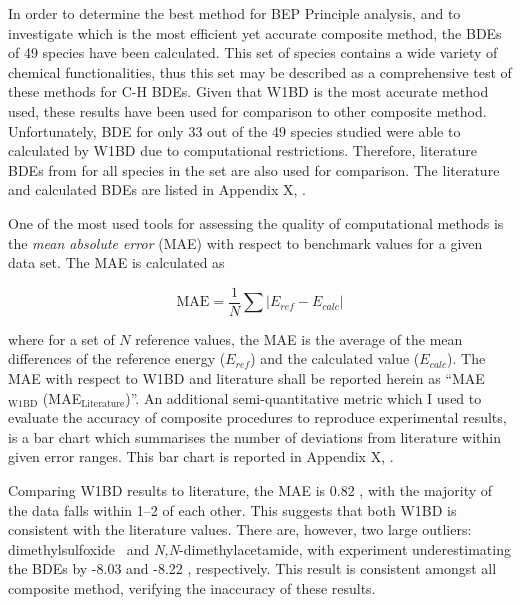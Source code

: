 In order to determine the best method for BEP Principle analysis, and to investigate which is the most efficient yet accurate composite method, the BDEs of 49 species have been calculated. This set of species contains a wide variety of chemical functionalities, thus this set may be described as a comprehensive test of these methods for C-H BDEs. Given that W1BD is the most accurate method used, these results have been used for comparison to other composite method. Unfortunately, BDE for only 33 out of the 49 species studied were able to calculated by W1BD due to computational restrictions. Therefore, literature BDEs from \citet{Luo2002} for all species in the set are also used for comparison. The literature and calculated BDEs are listed in Appendix X, .

One of the most used tools for assessing the quality of computational methods is the \emph{mean absolute error} (MAE) with respect to benchmark values for a given data set.\cite{Savin2014} The MAE is calculated as

\begin{equation}
  \mathrm{MAE} = \frac{1}{N} \sum | E_{ref} - E_{calc}|
\end{equation}

\noindent where for a set of $N$ reference values, the MAE is the average of the mean differences of the reference energy ($E_{ref}$) and the calculated value ($E_{calc}$). The MAE with respect to W1BD and literature shall be reported herein as ``MAE$_{\mathrm{W1BD}}$ (MAE$_{\mathrm{Literature}}$)''. An additional semi-quantitative metric which I used to evaluate the accuracy of composite procedures to reproduce experimental results, is a bar chart which summarises the number of deviations from literature within given error ranges. This bar chart is reported in Appendix X, .

Comparing W1BD results to literature, the MAE is 0.82 \kcalmol, with the majority of the data falls within 1--2 \kcalmol of each other. This suggests that both W1BD is consistent with the literature values. There are, however, two large outliers: dimethylsulfoxide\footnotemark~ and \emph{N,N}-dimethylacetamide, with experiment underestimating the BDEs by -8.03 and -8.22 \kcalmol, respectively. This result is consistent amongst all composite method, verifying the inaccuracy of these results.


